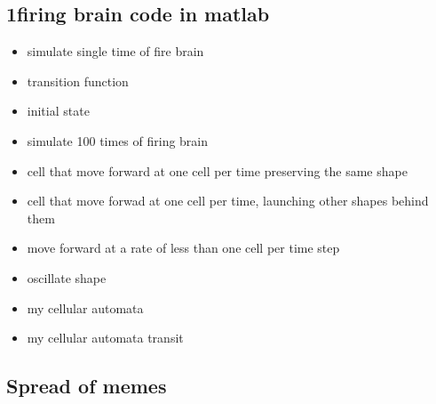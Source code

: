 \documentclass[12pt]{article}
\begin{document}
\subsection{1firing brain code in matlab}
\singlespacing
\begin{itemize}
\item {\large simulate single time of fire brain}

\vspace{1cm}

\item {\large transition function}

\vspace{1cm}

\item {\large initial state}

\vspace{1cm}

\item {\large simulate 100 times of firing brain}

\vspace{1cm}

\item {\large cell that move forward at one cell per time preserving the same shape}

\vspace{1cm}

\item {\large cell that move forwad at one cell per time, launching other shapes behind them}

\vspace{1cm}

\item {\large move forward at a rate of less than one cell per time step}

\vspace{1cm}

\item {\large oscillate shape}

\vspace{1cm}


\item {\large my cellular automata}

\vspace{1cm}

\item {\large my cellular automata transit}

\vspace{1cm}


\end{itemize}



\subsection{Spread of memes}
\end{document}
